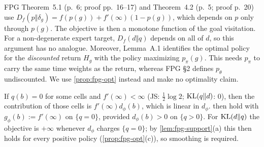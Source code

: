 \begin{remark}\label{rem:fpg-dirac}
FPG Theorem~5.1 (p.~6; proof pp.~16--17) and Theorem~4.2 (p.~5; proof p.~20) use $D_f(p\Vert\delta_g)=f(p(g))+f'(\infty)(1-p(g))$, which depends on $p$ only through $p(g)$.
The objective is then a monotone function of the goal visitation.
For a non-degenerate expert target, $D_f(d\Vert q)$ depends on all of $d$, so this argument has no analogue.
Moreover, Lemma~A.1 identifies the optimal policy for the \emph{discounted} return $H_g$ with the policy maximizing $p_\pi(g)$. This needs $p_\pi$ to carry the same time weights as the return, whereas FPG \S2 defines $p_\theta$ undiscounted.
We use \cref{prop:fpg-opt} instead and make no optimality claim.
\end{remark}

\begin{remark}\label{rem:fpg-zeros}
If $q(b)=0$ for some cells and $f'(\infty)<\infty$ (JS: $\frac12\log2$; $\mathrm{KL}(q\Vert d)$: $0$), then the contribution of those cells is $f'(\infty)d_\phi(b)$, which is linear in $d_\phi$.
 then hold with $g_\phi(b):=f'(\infty)$ on $\{q=0\}$, provided $d_\phi(b)>0$ on $\{q>0\}$.
For $\mathrm{KL}(d\Vert q)$ the objective is $+\infty$ whenever $d_\phi$ charges $\{q=0\}$; by \cref{lem:fpg-support}(a) this then holds for every positive policy (\cref{prop:fpg-opt}(c)), so smoothing is required.
\end{remark}
